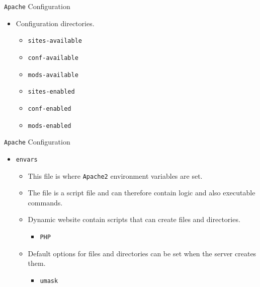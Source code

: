 \documentclass[xcolor=table]{beamer}
\begin{document}
\begin{frame}{\texttt{Apache} Configuration}
  \begin{itemize}
    \item Configuration directories.
      \begin{itemize}
        \item \texttt{sites-available}
        \item \texttt{conf-available}  
        \item \texttt{mods-available}  
        \item \texttt{sites-enabled}
        \item \texttt{conf-enabled}    
        \item \texttt{mods-enabled}
      \end{itemize}
  \end{itemize}
\end{frame}

\begin{frame}{\texttt{Apache} Configuration}
  \begin{itemize}
    \item \texttt{envars}
      \begin{itemize}
        \item This file is where \texttt{Apache2} environment variables are set.
        \item The file is a script file and can therefore contain logic and also executable commands.
        \item Dynamic website contain scripts that can create files and directories.
          \begin{itemize} 
            \item \texttt{PHP}
          \end{itemize}
        \item Default options for files and directories can be set when the server creates them.
          \begin{itemize} 
            \item \texttt{umask}
          \end{itemize}
      \end{itemize}
  \end{itemize}
\end{frame}
\end{document}
